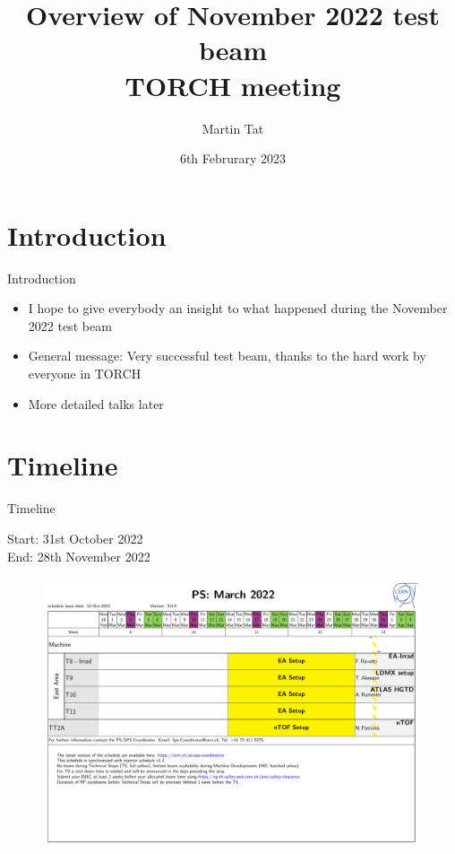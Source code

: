 \documentclass[xcolor = table]{beamer}
\title[TORCH meeting]{Overview of November 2022 test beam\\TORCH meeting}
\author{Martin Tat}
\institute{University of Oxford}
\date{6th Februrary 2023}
\begin{document}
\begin{frame}
  \titlepage
\end{frame}


\section{Introduction}
\begin{frame}{Introduction}
  \begin{itemize}
    \setlength\itemsep{2.0em}
    \item{I hope to give everybody an insight to what happened during the November 2022 test beam}
    \item{General message: Very successful test beam, thanks to the hard work by everyone in TORCH}
    \item{More detailed talks later}
  \end{itemize}
\end{frame}

\section{Timeline}
\begin{frame}{Timeline}
  \begin{center}
    \large Start: 31st October 2022\\
    \large End: 28th November 2022
  \end{center}
  \vspace{-0.5cm}
  \begin{figure}
    \centering
    \includegraphics[width = 1.0\textwidth,trim={0 8.5cm 0 0 0},clip=true,page=9]{Plots/PSDetailedSchedule_v3_0_0.pdf}
  \end{figure}
\end{frame}
\end{document}
